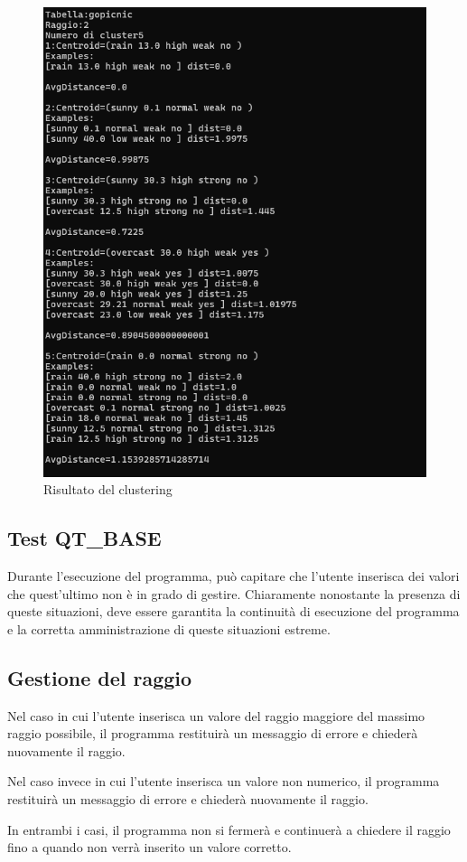 \begin{figure}[h!]
    \centering
    \includegraphics[width = 0.5 \textwidth]{images/risultato atteso.png}
    \caption{Risultato del clustering}
\end{figure}

\subsection{Test QT\_BASE}

Durante l'esecuzione del programma, può capitare che l'utente inserisca dei valori che quest'ultimo non è in grado di gestire. Chiaramente nonostante la presenza di queste situazioni, deve essere garantita la continuità di esecuzione del programma e la corretta amministrazione di queste situazioni estreme.

\subsection*{Gestione del raggio}

Nel caso in cui l'utente inserisca un valore del raggio maggiore del massimo raggio possibile, il programma restituirà un messaggio di errore e chiederà nuovamente il raggio.

Nel caso invece in cui l'utente inserisca un valore non numerico, il programma restituirà un messaggio di errore e chiederà nuovamente il raggio.

In entrambi i casi, il programma non si fermerà e continuerà a chiedere il raggio fino a quando non verrà inserito un valore corretto.

